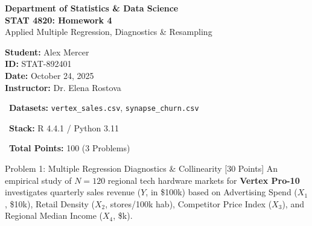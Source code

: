 \documentclass[11pt,a4paper]{scrartcl}
\begin{document}

\begin{tcolorbox}[
  enhanced,
  colback=navyprimary,
  colframe=navyprimary,
  arc=2.5mm,
  top=5pt, bottom=5pt, left=8pt, right=8pt
]
  \color{white}
  \begin{minipage}[t]{0.62\textwidth}
    {\sffamily\footnotesize\color{tealaccent!35}\textbf{Department of Statistics \& Data Science}} \\[1pt]
    {\sffamily\LARGE\bfseries STAT 4820: Homework 4} \\[1pt]
    {\sffamily\small Applied Multiple Regression, Diagnostics \& Resampling}
  \end{minipage}%
  \hfill
  \begin{minipage}[t]{0.35\textwidth}
    \raggedleft\sffamily\footnotesize
    \textbf{Student:} Alex Mercer \\
    \textbf{ID:} STAT-892401 \\
    \textbf{Date:} October 24, 2025 \\
    \textbf{Instructor:} Dr. Elena Rostova
  \end{minipage}
\end{tcolorbox}

\vspace{-4pt}

\begin{tcolorbox}[
  enhanced,
  colback=bgsoft,
  colframe=codeframe,
  arc=1mm,
  boxrule=0.5pt,
  top=2pt, bottom=2pt, left=6pt, right=6pt
]
  \sffamily\footnotesize\color{charcoal}
  \begin{minipage}{0.33\textwidth}
    \faFile\ \textbf{Datasets:} \texttt{vertex\_sales.csv}, \texttt{synapse\_churn.csv}
  \end{minipage}\hfill
  \begin{minipage}{0.32\textwidth}
    \faCode\ \textbf{Stack:} R 4.4.1 / Python 3.11
  \end{minipage}\hfill
  \begin{minipage}{0.31\textwidth}
    \raggedleft\faCheckCircle\ \textbf{Total Points:} 100 (3 Problems)
  \end{minipage}
\end{tcolorbox}

\vspace{1pt}

\begin{problembox}{Problem 1: Multiple Regression Diagnostics \& Collinearity [30 Points]}
An empirical study of $N = 120$ regional tech hardware markets for \textbf{Vertex Pro-10} investigates quarterly sales revenue ($Y$, in \$100k) based on Advertising Spend ($X_1$, \$10k), Retail Density ($X_2$, stores/100k hab), Competitor Price Index ($X_3$), and Regional Median Income ($X_4$, \$k).
\end{problembox}
\end{document}
